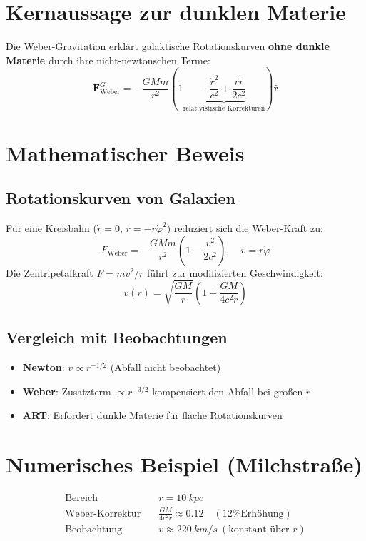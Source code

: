\section{Kernaussage zur dunklen Materie}
Die Weber-Gravitation erklärt galaktische Rotationskurven \textbf{ohne dunkle Materie} durch ihre nicht-newtonschen Terme:
\begin{equation}
\mathbf{F}_{\text{Weber}}^G = -\frac{GMm}{r^2}\left(1 \underbrace{-\frac{\dot{r}^2}{c^2} + \frac{r\ddot{r}}{2c^2}}_{\text{relativistische Korrekturen}}\right)\mathbf{\hat{r}}
\end{equation}

\section*{Mathematischer Beweis}

\subsection*{Rotationskurven von Galaxien}
Für eine Kreisbahn (\(\dot{r}=0\), \(\ddot{r} = -r\dot{\varphi}^2\)) reduziert sich die Weber-Kraft zu:
\begin{equation}
F_{\text{Weber}} = -\frac{GMm}{r^2}\left(1 - \frac{v^2}{2c^2}\right), \quad v = r\dot{\varphi}
\end{equation}
Die Zentripetalkraft \(F = mv^2/r\) führt zur modifizierten Geschwindigkeit:
\begin{equation}
v(r) = \sqrt{\frac{GM}{r}} \left(1 + \frac{GM}{4c^2r}\right)
\end{equation}

\subsection*{Vergleich mit Beobachtungen}
\begin{itemize}
\item \textbf{Newton}: \(v \propto r^{-1/2}\) (Abfall nicht beobachtet)
\item \textbf{Weber}: Zusatzterm \(\propto r^{-3/2}\) kompensiert den Abfall bei großen \(r\)
\item \textbf{ART}: Erfordert dunkle Materie für flache Rotationskurven
\end{itemize}

\section*{Numerisches Beispiel (Milchstraße)}
\begin{align*}
\text{Bereich} &\quad r = \SI{10}{kpc} \\
\text{Weber-Korrektur} &\quad \frac{GM}{4c^2r} \approx 0.12 \quad (\text{12\% Erhöhung}) \\
\text{Beobachtung} &\quad v \approx \SI{220}{km/s} \ (\text{konstant über } r)
\end{align*}

